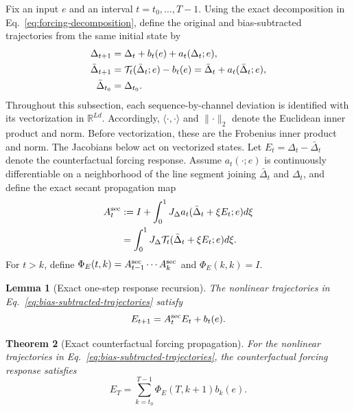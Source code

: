 \documentclass[letterpaper]{article} %
\newcommand{\R}{\mathbb{R}}
\newcommand{\norm}[1]{\lVert#1\rVert}
\newcommand{\Tmap}{\mathcal{T}}
\newtheorem{theorem}{Theorem}
\newtheorem{lemma}[theorem]{Lemma}
\theoremstyle{remark}
\begin{document}
Fix an input $e$ and an interval $t=t_0,\ldots,T-1$.  Using the exact decomposition in Eq.~\ref{eq:forcing-decomposition}, define the original and bias-subtracted trajectories from the same initial state by
\begin{align}
	\Delta_{t+1}
	 & =\Delta_t+b_t(e)+a_t(\Delta_t;e),                                      \notag \\
	\bar\Delta_{t+1}
	 & =\Tmap_t(\bar\Delta_t;e)-b_t(e)
	=\bar\Delta_t+a_t(\bar\Delta_t;e),                         \notag                \\
	\bar\Delta_{t_0}
	 & =\Delta_{t_0}.
	\label{eq:bias-subtracted-trajectories}
\end{align}
Throughout this subsection, each sequence-by-channel deviation is identified with its vectorization in $\R^{Ld}$.  Accordingly, $\langle\cdot,\cdot\rangle$ and $\norm{\cdot}_2$ denote the Euclidean inner product and norm.  Before vectorization, these are the Frobenius inner product and norm.  The Jacobians below act on vectorized states.  Let $E_t=\Delta_t-\bar\Delta_t$ denote the counterfactual forcing response.  Assume $a_t(\cdot;e)$ is continuously differentiable on a neighborhood of the line segment joining $\bar\Delta_t$ and $\Delta_t$, and define the exact secant propagation map
\begin{equation}
	\begin{aligned}
		A_t^{\rm sec}
		 & :=I+\int_0^1
		J_\Delta a_t(\bar\Delta_t+\xi E_t;e)d\xi \\
		 & =\int_0^1
		J_\Delta\Tmap_t(\bar\Delta_t+\xi E_t;e)d\xi.
	\end{aligned}
	\label{eq:secant-propagation}
\end{equation}
For $t>k$, define $\Phi_E(t,k)=A_{t-1}^{\rm sec}\cdots A_k^{\rm sec}$ and $\Phi_E(k,k)=I$.

\begin{lemma}[Exact one-step response recursion]
	\label{lem:onestep-forcing}
	The nonlinear trajectories in Eq.~\ref{eq:bias-subtracted-trajectories} satisfy
	\begin{equation}
		E_{t+1}
		=A_t^{\rm sec}E_t+b_t(e).
		\label{eq:exact-response-step}
	\end{equation}
\end{lemma}

\begin{theorem}[Exact counterfactual forcing propagation]
	\label{thm:counterfactual-forcing}
	For the nonlinear trajectories in Eq.~\ref{eq:bias-subtracted-trajectories}, the counterfactual forcing response satisfies
	\begin{equation}
		E_T
		=\sum_{k=t_0}^{T-1}\Phi_E(T,k+1)b_k(e).
		\label{eq:exact-finite-horizon-forcing}
	\end{equation}
\end{theorem}
\end{document}
